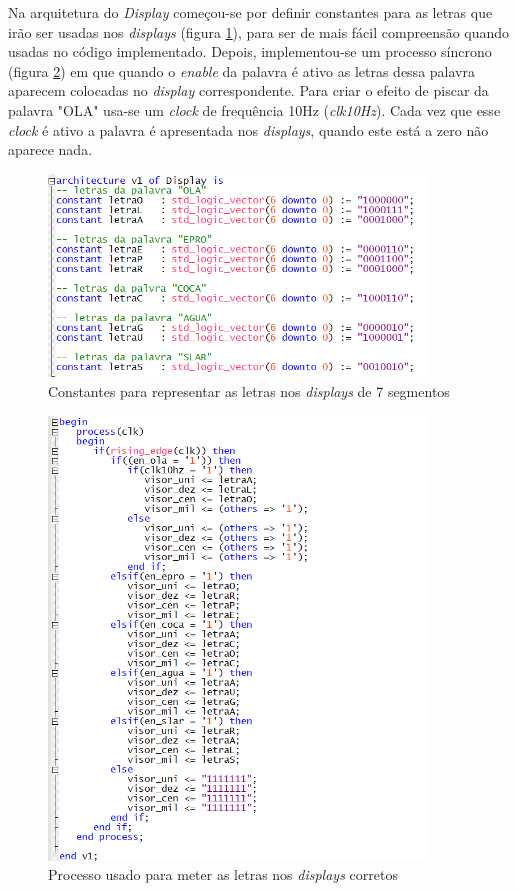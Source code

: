 \documentclass{report}
\begin{document}
Na arquitetura do \textit{Display} começou-se por definir constantes para as letras que irão ser usadas nos \textit{displays} (figura \ref{fig:Letras1}), para ser de mais fácil compreensão quando usadas no código implementado. Depois, implementou-se um processo síncrono (figura \ref{fig:Displayprocess}) em que quando o \textit{enable} da palavra é ativo as letras dessa palavra aparecem colocadas no \textit{display} correspondente. Para criar o efeito de piscar da palavra "OLA" usa-se um \textit{clock} de frequência 10Hz (\textit{clk10Hz}). Cada vez que esse \textit{clock} é ativo a palavra é apresentada nos \textit{displays}, quando este está a zero não aparece nada.  

\begin{figure}[H]
    \centering
    \includegraphics[width = 10cm]{DisplayLetras.png}
    \caption{Constantes para representar as letras nos \textit{displays} de 7 segmentos}
    \label{fig:Letras1}
\end{figure}

\begin{figure}[H]
    \centering
    \includegraphics[width = 10cm]{Displayprocess.png}
    \caption{Processo usado para meter as letras nos \textit{displays} corretos}
    \label{fig:Displayprocess}
\end{figure}
\end{document}
